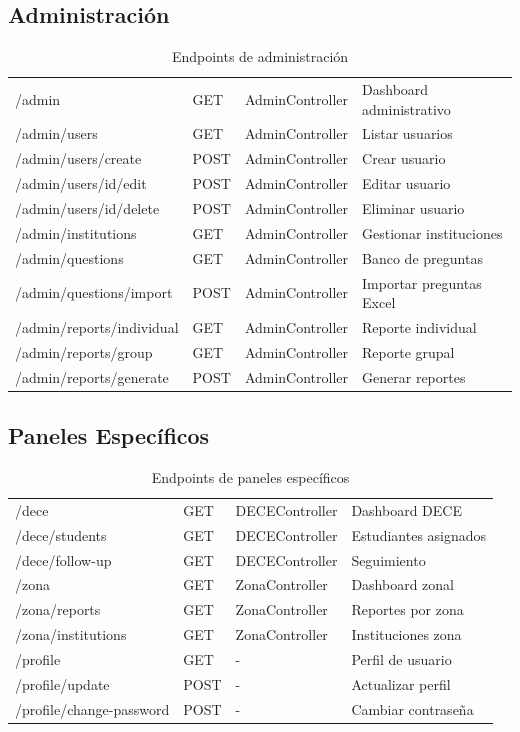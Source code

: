 \documentclass[12pt, a4paper]{report}
\begin{document}
\subsection{Administración}
\begin{table}[H]
\centering
\begin{tabularx}{\textwidth}{|l|l|l|X|}
\hline
/admin & GET & AdminController & Dashboard administrativo \\
/admin/users & GET & AdminController & Listar usuarios \\
/admin/users/create & POST & AdminController & Crear usuario \\
/admin/users/{id}/edit & POST & AdminController & Editar usuario \\
/admin/users/{id}/delete & POST & AdminController & Eliminar usuario \\
/admin/institutions & GET & AdminController & Gestionar instituciones \\
/admin/questions & GET & AdminController & Banco de preguntas \\
/admin/questions/import & POST & AdminController & Importar preguntas Excel \\
/admin/reports/individual & GET & AdminController & Reporte individual \\
/admin/reports/group & GET & AdminController & Reporte grupal \\
/admin/reports/generate & POST & AdminController & Generar reportes \\
\hline
\end{tabularx}
\caption{Endpoints de administración}
\end{table}

\subsection{Paneles Específicos}
\begin{table}[H]
\centering
\begin{tabularx}{\textwidth}{|l|l|l|X|}
\hline
/dece & GET & DECEController & Dashboard DECE \\
/dece/students & GET & DECEController & Estudiantes asignados \\
/dece/follow-up & GET & DECEController & Seguimiento \\
/zona & GET & ZonaController & Dashboard zonal \\
/zona/reports & GET & ZonaController & Reportes por zona \\
/zona/institutions & GET & ZonaController & Instituciones zona \\
/profile & GET & - & Perfil de usuario \\
/profile/update & POST & - & Actualizar perfil \\
/profile/change-password & POST & - & Cambiar contraseña \\
\hline
\end{tabularx}
\caption{Endpoints de paneles específicos}
\end{table}
\end{document}
